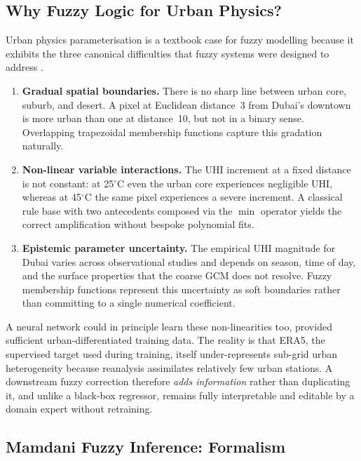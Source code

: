 \documentclass[conference]{IEEEtran}
\begin{document}
\subsection{Why Fuzzy Logic for Urban Physics?}
\label{sec:whyfuzzy}

Urban physics parameterisation is a textbook case for fuzzy modelling
because it exhibits the three canonical difficulties that fuzzy systems
were designed to address \cite{zadeh1965fuzzy,ross2010fuzzy}.

\begin{enumerate}[leftmargin=1.5em]
  \item \textbf{Gradual spatial boundaries.}  There is no sharp line
    between urban core, suburb, and desert.  A pixel at Euclidean
    distance~3 from Dubai's downtown is more urban than one at
    distance~10, but not in a binary sense.  Overlapping trapezoidal
    membership functions capture this gradation naturally.
  \item \textbf{Non-linear variable interactions.}  The UHI increment at
    a fixed distance is not constant: at 25\(^{\circ}\)C even the urban
    core experiences negligible UHI, whereas at 45\(^{\circ}\)C the same
    pixel experiences a severe increment.  A classical rule base with
    two antecedents composed via the \(\min\) operator yields the correct
    amplification without bespoke polynomial fits.
  \item \textbf{Epistemic parameter uncertainty.}  The empirical UHI
    magnitude for Dubai varies across observational studies
    \cite{radhi2013uae,globalmapuhi2018} and depends on season, time of
    day, and the surface properties that the coarse GCM does not
    resolve.  Fuzzy membership functions represent this uncertainty as
    soft boundaries rather than committing to a single numerical
    coefficient.
\end{enumerate}

A neural network could in principle learn these non-linearities too,
provided sufficient urban-differentiated training data.  The reality is
that ERA5, the supervised target used during training, itself
under-represents sub-grid urban heterogeneity because reanalysis assimilates
relatively few urban stations.  A downstream fuzzy correction therefore \emph{adds information} rather than duplicating it, and unlike a black-box regressor, remains fully interpretable and editable by a domain expert without retraining.

\subsection{Mamdani Fuzzy Inference: Formalism}
\label{sec:mamdani}
\end{document}
